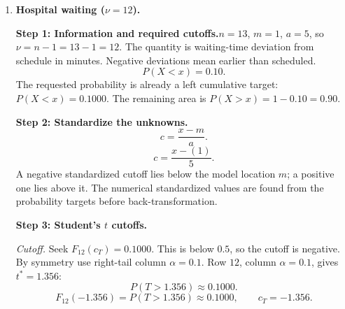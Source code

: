 \begin{enumerate}[leftmargin=*,label=\textbf{\arabic*.},itemsep=12pt,parsep=3pt,topsep=5pt]
\par\noindent\begin{minipage}{\linewidth}
\par\textbf{Step 7: Interpretation.}\nopagebreak\enspace The alert limits are $(-7.91,7.78)$ minutes under $t$ and $(-7.20,7.40)$ minutes under normal. Each model leaves approximately $5\%$ below its lower limit, $10\%$ above its upper limit, and $85\%$ between them. The negative lower limits mean faster processing and positive upper limits mean slower processing. Normal moves the lower endpoint inward by $0.71$ minutes and the upper endpoint inward by $0.38$ minutes; the unequal tails give unequal distances from the mean.
\end{minipage}\par
\item \begin{minipage}[t]{\linewidth}\textbf{Hospital waiting ($\nu=12$).}\nopagebreak
\par\textbf{Step 1: Information and required cutoffs.}\nopagebreak\enspace $n=13$, $m=1$, $a=5$, so $\nu=n-1=13-1=12$. The quantity is waiting-time deviation from schedule in minutes. Negative deviations mean earlier than scheduled.\[
P(X<x)=0.10.
\]
The requested probability is already a left cumulative target: $P(X<x)=0.1000$. The remaining area is $P(X>x)=1-0.10=0.90$.
\end{minipage}\par
\par\noindent\begin{minipage}{\linewidth}
\par\textbf{Step 2: Standardize the unknowns.}\nopagebreak\enspace \[
c=\frac{x-m}{a}.
\]
\[
c=\frac{x-(1)}{5}.
\]
A negative standardized cutoff lies below the model location $m$; a positive one lies above it. The numerical standardized values are found from the probability targets before back-transformation.
\end{minipage}\par
\par\noindent\begin{minipage}{\linewidth}
\par\textbf{Step 3: Student's $t$ cutoffs.}\nopagebreak\enspace \par\textit{Cutoff.} Seek $F_{12}(c_{T})=0.1000$. This is below $0.5$, so the cutoff is negative. By symmetry use right-tail column $\alpha=0.1$. Row $12$, column $\alpha=0.1$, gives $t^*=1.356$:\[
P(T>1.356)\approx0.1000.
\]
\[
F_{12}(-1.356)=P(T>1.356)\approx0.1000,\qquad c_{T}=-1.356.
\]


\end{minipage}
\end{enumerate}
